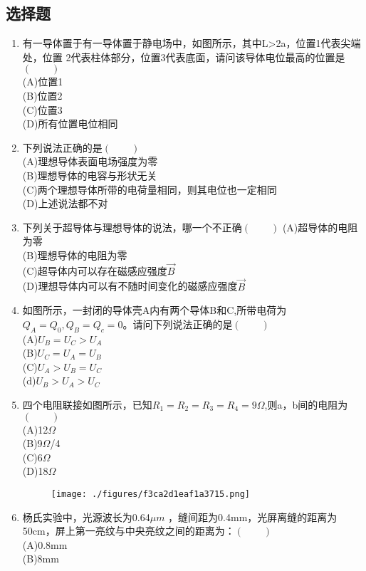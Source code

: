 \subsection{选择题}
\begin{enumerate}
\item 有一导体置于有一导体置于静电场中，如图所示，其中L>2a，位置1代表尖端处，位置 2代表柱体部分，位置3代表底面，请问该导体电位最高的位置是$(\qquad)$\\
(A)位置1\\
(B)位置2\\
(C)位置3\\
(D)所有位置电位相同
\item 下列说法正确的是$(\qquad)$\\
(A)理想导体表面电场强度为零\\
(B)理想导体的电容与形状无关\\
(C)两个理想导体所带的电荷量相同，则其电位也一定相同\\
(D)上述说法都不对
\item 下列关于超导体与理想导体的说法，哪一个不正确$(\qquad)$
(A)超导体的电阻为零\\
(B)理想导体的电阻为零\\
(C)超导体内可以存在磁感应强度$\vec B$\\
(D)理想导体内可以有不随时间变化的磁感应强度$\vec B$
\item 如图所示，一封闭的导体壳A内有两个导体B和C,所带电荷为$Q_A=Q_0,Q_B=Q_c=0$。请问下列说法正确的是$(\qquad)$\\
(A)$U_B=U_C>U_A$\\
(B)$U_C=U_A=U_B$\\
(C)$U_A>U_B=U_C$\\
(d)$U_B>U_A>U_C$
\item 四个电阻联接如图所示，已知$R_1=R_2=R_3=R_4=9\Omega$,则a，b间的电阻为$(\qquad)$\\
(A)12$\Omega$\\
(B)9$\Omega$/4\\
(C)6$\Omega$\\
(D)18$\Omega$
\begin{figure}[ht]
\centering
\texttt{[image: ./figures/f3ca2d1eaf1a3715.png]}
\caption{} \label{fig_CD09_1}
\end{figure}
\item 杨氏实验中，光源波长为0.64$\mu m$ ，缝间距为0.4mm，光屏离缝的距离为50cm，屏上第一亮纹与中央亮纹之间的距离为：$(\qquad)$\\
(A)0.8mm\\
(B)8mm\\

\end{enumerate}
